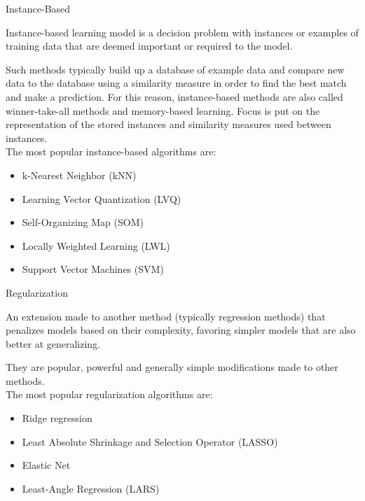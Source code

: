 \documentclass{beamer}
\begin{document}
\begin{frame}{Instance-Based}
	\begin{flushleft}
		Instance-based learning model is a decision problem with instances or examples of training data that are deemed important or required to the model.

Such methods typically build up a database of example data and compare new data to the database using a similarity measure in order to find the best match and make a prediction. For this reason, instance-based methods are also called winner-take-all methods and memory-based learning. Focus is put on the representation of the stored instances and similarity measures used between instances.
\\
\vspace{10pt}
	The most popular instance-based algorithms are:
\begin{itemize}
	\item k-Nearest Neighbor (kNN)
	\item Learning Vector Quantization (LVQ)
	\item Self-Organizing Map (SOM)
	\item Locally Weighted Learning (LWL)
	\item Support Vector Machines (SVM)
\end{itemize}
	\end{flushleft}
\end{frame}

\begin{frame}{Regularization}
\begin{flushleft}
		An extension made to another method (typically regression methods) that penalizes models based on their complexity, favoring simpler models that are also better at generalizing.

		They are popular, powerful and generally simple modifications made to other methods.
\\
\vspace{10pt}
	The most popular regularization algorithms are:
\begin{itemize}
	\item Ridge regression
	\item Least Absolute Shrinkage and Selection Operator (LASSO)
	\item Elastic Net
	\item Least-Angle Regression (LARS)
\end{itemize}
	\end{flushleft}
\end{frame}
\end{document}
